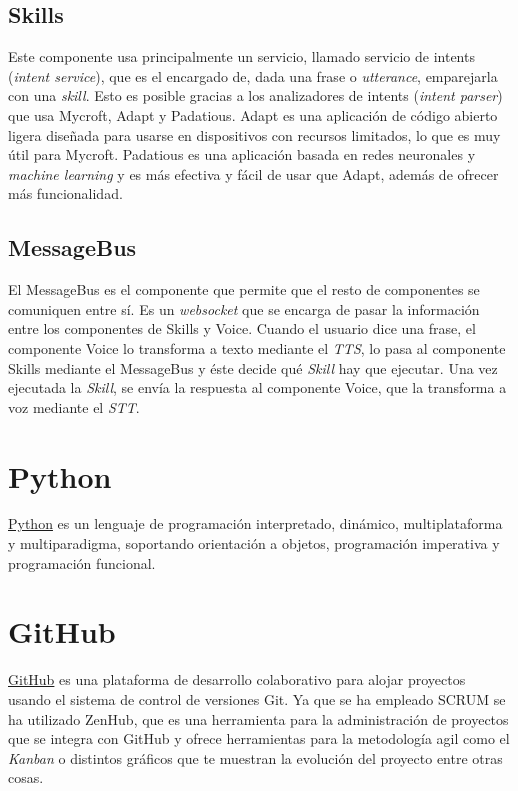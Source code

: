 \subsection{Skills\cite{TechnologyOverview}}

Este componente usa principalmente un servicio, llamado servicio de intents (\textit{intent service}), que es el encargado de, dada una frase o \textit{utterance}, emparejarla con una \textit{skill}. Esto es posible gracias a los analizadores de intents (\textit{intent parser}) que usa Mycroft, Adapt y Padatious.
Adapt es una aplicación de código abierto ligera diseñada para usarse en dispositivos con recursos limitados, lo que es muy útil para Mycroft. Padatious es una aplicación basada en redes neuronales y \textit{machine learning} y es más efectiva y fácil de usar que Adapt, además de ofrecer más funcionalidad.

\subsection{MessageBus\cite{MessageBus}}

El MessageBus es el componente que permite que el resto de componentes se comuniquen entre sí. Es un \textit{websocket} que se encarga de pasar la información entre los componentes de Skills y Voice. Cuando el usuario dice una frase, el componente Voice lo transforma a texto mediante el \textit{TTS}, lo pasa al componente Skills mediante el MessageBus y éste decide qué \textit{Skill} hay que ejecutar. Una vez ejecutada la \textit{Skill}, se envía la respuesta al componente Voice, que la transforma a voz mediante el \textit{STT}.


\section{Python}

\href{https://www.python.org/}{Python}\cite{Python2020} es un lenguaje de programación interpretado, dinámico, multiplataforma y multiparadigma, soportando orientación a objetos, programación imperativa y programación funcional.

\section{GitHub}

\href{https://github.com/}{GitHub}\cite{GitHub2020} es una plataforma de desarrollo colaborativo para alojar proyectos usando el sistema de control de versiones Git. Ya que se ha empleado SCRUM se ha utilizado ZenHub, que es una herramienta para la administración de proyectos que se integra con GitHub y ofrece herramientas para la metodología agil como el \textit{Kanban} o distintos gráficos que te muestran la evolución del proyecto entre otras cosas.

